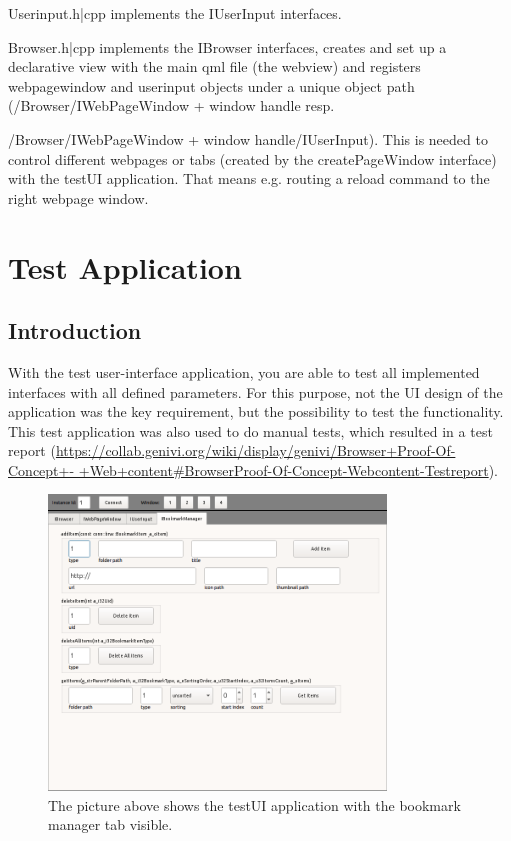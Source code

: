 \documentclass{pelagicore}
\begin{document}
Userinput.h|cpp implements the IUserInput interfaces.

Browser.h|cpp implements the IBrowser interfaces, creates and set up a
declarative view with the main qml file (the webview) and registers
webpagewindow and userinput objects under a unique object path
(/Browser/IWebPageWindow + window handle resp.

/Browser/IWebPageWindow + window handle/IUserInput). This is needed to control
different webpages or tabs (created by the createPageWindow interface) with the
testUI application. That means e.g. routing a reload command to the right
webpage window.

\section{Test Application}
\subsection{Introduction}
With the test user-interface application, you are able to test all implemented
interfaces with all defined parameters. For this purpose, not the UI design of
the application was the key requirement, but the possibility to test the
functionality. This test application was also used to do manual tests, which
resulted in a test report
(\url{https://collab.genivi.org/wiki/display/genivi/Browser+Proof-Of-Concept+-
+Web+content#BrowserProof-Of-Concept-Webcontent-Testreport}).

\begin{figure}[!ht]
    \center
    \includegraphics[width=0.8\textwidth]{testui.png}
    \caption{The picture above shows the testUI application with the bookmark
             manager tab visible.}
\end{figure}
\end{document}
